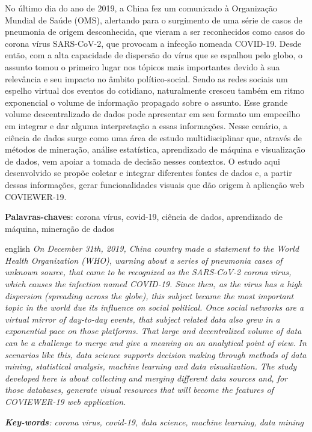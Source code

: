\begin{resumo}

No último dia do ano de 2019, a China fez um comunicado à Organização Mundial de Saúde (OMS), alertando para o surgimento de uma série de casos de pneumonia de origem desconhecida, que vieram a ser reconhecidos como casos do corona vírus SARS-CoV-2, que provocam a infecção nomeada COVID-19. Desde então, com a alta capacidade de dispersão do vírus que se espalhou pelo globo, o assunto tomou o primeiro lugar nos tópicos mais importantes devido à sua relevância e seu impacto no âmbito político-social. Sendo as redes sociais um espelho virtual dos eventos do cotidiano, naturalmente cresceu também em ritmo exponencial o volume de informação propagado sobre o assunto. Esse grande volume descentralizado de dados pode apresentar em seu formato um empecilho em integrar e dar alguma interpretação a essas informações. Nesse cenário, a ciência de dados surge como uma área de estudo multidisciplinar que, através de métodos de mineração, análise estatística, aprendizado de máquina e visualização de dados, vem apoiar a tomada de decisão nesses contextos. O estudo aqui desenvolvido se propõe coletar e integrar diferentes fontes de dados e, a partir dessas informações, gerar funcionalidades visuais que dão origem à aplicação web COVIEWER-19.

 \vspace{\onelineskip}
    
 \noindent
 \textbf{Palavras-chaves}: corona vírus, covid-19, ciência de dados, aprendizado de máquina, mineração de dados
\end{resumo}

\begin{resumo}[Abstract]
 \begin{otherlanguage*}{english}
\textit{On December 31th, 2019, China country made a statement to the World Health Organization (WHO), warning about a series of pneumonia cases of unknown source, that came to be recognized as the SARS-CoV-2 corona virus, which causes the infection named COVID-19. Since then, as the virus has a high dispersion (spreading across the globe), this subject became the most important topic in the world due its influence on social political. Once social networks are a virtual mirror of day-to-day events, that subject related data also grew in a exponential pace on those platforms. That large and decentralized volume of data can be a challenge to merge and give a meaning on an analytical point of view. In scenarios like this, data science supports decision making through methods of data mining, statistical analysis, machine learning and data visualization. The study developed here is about collecting and merging different data sources and, for those databases, generate visual resources that will become the features of COVIEWER-19 web application. }

   \vspace{\onelineskip}
 
   \noindent 
   \textit{\textbf{Key-words}: corona virus, covid-19, data science, machine learning, data mining }
 \end{otherlanguage*}
\end{resumo}